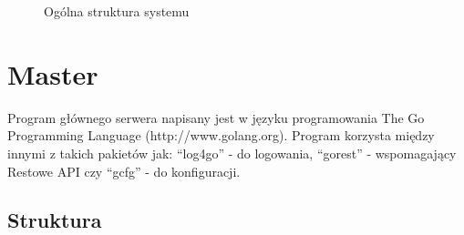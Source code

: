 \documentclass[paper=a4, fontsize=11pt]{scrartcl} %
\numberwithin{equation}{section} %
\numberwithin{figure}{section} %
\numberwithin{table}{section} %
\begin{document}
\begin{figure}[t]
	\begin{center}
		\caption{Ogólna struktura systemu}
	\end{center}
\end{figure}
\clearpage

\section{Master}
	Program głównego serwera napisany jest w języku programowania The Go Programming Language (http://www.golang.org). 
	Program korzysta między innymi z takich pakietów jak: ``log4go'' - do logowania, ``gorest'' - wspomagający Restowe API czy ``gcfg'' - do konfiguracji.
	\subsection{Struktura}
		
\end{document}
